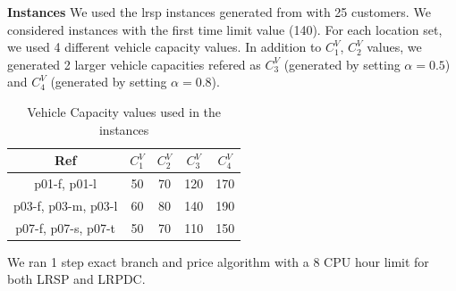 {\bf Instances} 
We used the lrsp instances generated from \citet{Cordeau} 
with 25 customers. We considered instances with the first time limit value (140).    
For each location set, we used 4 different vehicle capacity values. 
In addition to $C^V_1$, $C^V_2$ values, we generated 2 larger vehicle 
capacities refered as $C^V_3$ (generated by setting $\alpha = 0.5$) and $C^V_4$ 
(generated by setting $\alpha = 0.8$).
\begin {table}[h]
\begin{center}
\caption {Vehicle Capacity values used in the instances} \label{VCap-values}
\begin {tabular}[t]{|c|c|c|c|c|} \hline
Ref & $C^V_1$ & $C^V_2$ & $C^V_3$ & $C^V_4$\\ \hline
p01-f, p01-l & 50 & 70 & 120 & 170 \\ 
p03-f, p03-m, p03-l & 60 & 80 & 140 & 190 \\ 
p07-f, p07-s, p07-t & 50 & 70 & 110 & 150 \\\hline
\end{tabular}
\end{center}
\end{table}
We ran 1 step exact branch and price algorithm with a 8 CPU hour limit for both
LRSP and LRPDC. 

